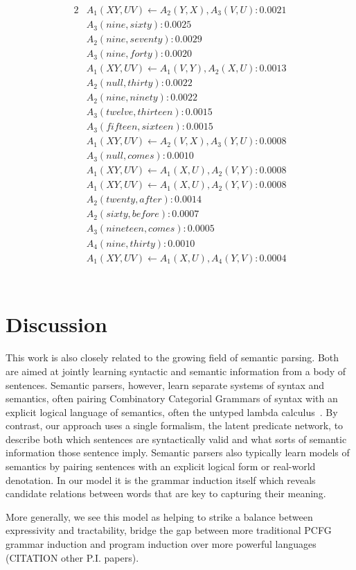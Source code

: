 \documentclass[11pt, twocolumn]{article}
\begin{document}
\begin{alignat*}{2}
&A_1(X Y, U V) \leftarrow A_2(Y, X), A_3(V, U) : 0.0021 \\
&A_3(nine, sixty) : 0.0025 \\
&A_2(nine, seventy) : 0.0029 \\
&A_3(nine, forty) : 0.0020 \\
&A_1(X Y, U V) \leftarrow A_1(V, Y), A_2(X, U) : 0.0013 \\
&A_2(null, thirty) : 0.0022 \\
&A_2(nine, ninety) : 0.0022 \\
&A_3(twelve, thirteen) : 0.0015 \\
&A_3(fifteen, sixteen) : 0.0015 \\
&A_1(X Y, U V) \leftarrow A_2(V, X), A_3(Y, U) : 0.0008 \\
&A_3(null, comes) : 0.0010 \\
&A_1(X Y, U V) \leftarrow A_1(X, U), A_2(V, Y) : 0.0008 \\
&A_1(X Y, U V) \leftarrow A_1(X, U), A_2(Y, V) : 0.0008 \\
&A_2(twenty, after) : 0.0014 \\
&A_2(sixty, before) : 0.0007 \\
&A_3(nineteen, comes) : 0.0005 \\
&A_4(nine, thirty) : 0.0010 \\
&A_1(X Y, U V) \leftarrow A_1(X, U), A_4(Y, V) : 0.0004 \\
\end{alignat*} \\
\section{Discussion}

This work is also closely related to the growing field of semantic
parsing. Both are aimed at jointly learning syntactic and semantic
information from a body of sentences. Semantic parsers, however, learn
separate systems of syntax and semantics, often pairing Combinatory
Categorial Grammars of syntax with an explicit logical language of
semantics, often the untyped lambda
calculus~\cite{berant2013semantic,liang2013learning,kwiatkowski2010inducing}. By
contrast, our approach uses a single formalism, the latent predicate
network, to describe both which sentences are syntactically valid and
what sorts of semantic information those sentence imply. Semantic
parsers also typically learn models of semantics by pairing sentences
with an explicit logical form or real-world denotation. In our model
it is the grammar induction itself which reveals candidate relations
between words that are key to capturing their meaning.

More generally, we see this model as helping to strike a balance
between expressivity and tractability, bridge the gap between more
traditional PCFG grammar induction and program induction over more
powerful languages~\cite{dechter2013bootstrap,} (CITATION other
P.I. papers).




\nocite{*}
\end{document}
